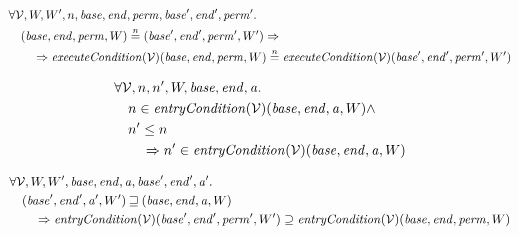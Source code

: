 \documentclass[a4paper]{article}
\newcommand{\nequal}[1][n]{\stackrel{\tiny{#1}}{=}}
\newcommand{\var}[1]{\mathit{#1}}
\newcommand{\addr}{\var{a}}
\newcommand{\start}{\var{base}}
\newcommand{\addrend}{\var{end}}
\newcommand{\perm}{\var{perm}}
\newcommand{\plainfun}[2]{
  \ifthenelse{\equal{#2}{}}
             {\mathit{#1}}
             {\mathit{#1}(#2)}
}
\newcommand{\execCond}[1]{\plainfun{executeCondition}{#1}}
\newcommand{\entryCond}[1]{\plainfun{entryCondition}{#1}}
\newcommand{\future}{\mathbin{\sqsupseteq}}
\newcommand{\asmType}{\plaindom{AsmType}}
\newcommand{\plaindom}[1]{\mathrm{#1}}
\newcommand{\intr}[2]{\mathcal{#1}}
\newcommand{\valueintr}[1]{\intr{V}{#1}}
\newcommand{\stdvr}{\valueintr{\asmType}}
\begin{document}
\begin{lemma}
\label{lem:ec-ne-world}
  \begin{align*}
    &\forall \stdvr, W, W',n,\start,\addrend,\perm,\start',\addrend',\perm' \ldotp \\
    &\quad (\start,\addrend,\perm,W) \nequal (\start',\addrend',\perm',W') \Rightarrow \\
    &\qquad \Rightarrow \execCond{}(\stdvr)(\start,\addrend,\perm,W) \nequal \execCond{}(\stdvr)(\start',\addrend',\perm',W')
  \end{align*}
\end{lemma}

\begin{lemma}
\label{lem:en-dc}
  \begin{align*}
    &\forall \stdvr, n,n',W,\start, \addrend, \addr \ldotp \\
    &\quad  n \in \entryCond{}(\stdvr)(\start,\addrend,\addr,W) \land \\
    &\quad  n' \leq n \\
    &\qquad \Rightarrow n' \in \entryCond{}(\stdvr)(\start,\addrend,\addr,W)
  \end{align*}
\end{lemma}

\begin{lemma}
  \label{lem:en-mono-world}
  \begin{align*}
    &\forall \stdvr,W, W',\start, \addrend, \addr, \start', \addrend', \addr' \ldotp \\
    &\quad  (\start',\addrend',\addr',W') \future (\start,\addrend,\addr,W) \\
    &\qquad \Rightarrow \entryCond{}(\stdvr)(\start',\addrend',\perm',W') \supseteq \entryCond{}(\stdvr)(\start,\addrend,\perm,W)
  \end{align*}
\end{lemma}
\end{document}
